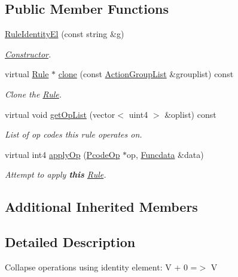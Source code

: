 \subsection*{Public Member Functions}
\begin{DoxyCompactItemize}
\item 
\mbox{\hyperlink{class_rule_identity_el_afc0361193dad4ad16cc7871cceda1528}{Rule\+Identity\+El}} (const string \&g)
\begin{DoxyCompactList}\small\item\em \mbox{\hyperlink{class_constructor}{Constructor}}. \end{DoxyCompactList}\item 
virtual \mbox{\hyperlink{class_rule}{Rule}} $\ast$ \mbox{\hyperlink{class_rule_identity_el_acacffc41cdb3a56a693132b9b6de63d0}{clone}} (const \mbox{\hyperlink{class_action_group_list}{Action\+Group\+List}} \&grouplist) const
\begin{DoxyCompactList}\small\item\em Clone the \mbox{\hyperlink{class_rule}{Rule}}. \end{DoxyCompactList}\item 
virtual void \mbox{\hyperlink{class_rule_identity_el_a7fff34176e6dff46c8f7acf4aae30bcf}{get\+Op\+List}} (vector$<$ uint4 $>$ \&oplist) const
\begin{DoxyCompactList}\small\item\em List of op codes this rule operates on. \end{DoxyCompactList}\item 
virtual int4 \mbox{\hyperlink{class_rule_identity_el_ac18d09444f528e99a17e0619c426d1ec}{apply\+Op}} (\mbox{\hyperlink{class_pcode_op}{Pcode\+Op}} $\ast$op, \mbox{\hyperlink{class_funcdata}{Funcdata}} \&data)
\begin{DoxyCompactList}\small\item\em Attempt to apply {\bfseries{this}} \mbox{\hyperlink{class_rule}{Rule}}. \end{DoxyCompactList}\end{DoxyCompactItemize}
\subsection*{Additional Inherited Members}


\subsection{Detailed Description}
Collapse operations using identity element\+: {\ttfamily V + 0 =$>$ V} 

